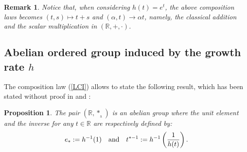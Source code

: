 \documentclass[10pt]{amsart}
\newtheorem{proposition}{Proposition}
\newtheorem{remark}{Remark}
\numberwithin{equation}{section}
\begin{document}
\begin{remark}
Notice that, when considering $h(t)=e^{t}$, the above composition laws becomes
$(t,s)\mapsto t+s$ and $(\alpha,t)\to \alpha t$, namely, the classical addition and
the scalar multiplication in $(\mathbb{R},+,\cdot)$.
\end{remark}



\subsection{Abelian ordered group induced by the growth rate $h$}
The composition law (\ref{LCI}) allows to state the following result, which has been stated without proof in \cite[Proposition 1]{EPR} and \cite[Sect.3]{JFP}: 
\begin{proposition}
\label{Groupe}
The pair $(\mathbb{R},\ast_{_h})$ is an abelian group where the unit element and the inverse for any $t \in \mathbb{R}$ are respectively defined by: 
\begin{equation}
\label{inverse}
e_{*}:=h^{-1}(1) \quad \textnormal{and} \quad
t^{*-1}:= h^{-1}\left( \frac{1}{h(t)}\right).
\end{equation}
\end{proposition}
\end{document}
